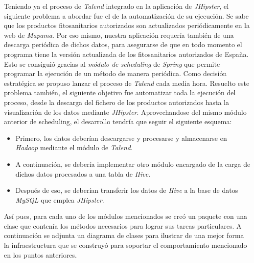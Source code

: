 \par
Teniendo ya el proceso de \textit{Talend} integrado en la aplicación de \textit{JHipster}, el siguiente problema a abordar fue el de la automatización de su ejecución. Se sabe que los productos fitosanitarios autorizados son actualizados periódicamente en la web de \textit{Mapama}. Por eso mismo, nuestra aplicación requería también de una descarga periódica de dichos datos, para asegurarse de que en todo momento el programa tiene la versión actualizada de los fitosanitarios autorizados de España. Esto se consiguió gracias al \textit{módulo de scheduling}\cite{spring_scheduling} de \textit{Spring} que permite programar la ejecución de un método de manera periódica. Como decisión estratégica se propuso lanzar el proceso de \textit{Talend} cada media hora. Resuelto este problema también, el siguiente objetivo fue automatizar toda la ejecución del proceso, desde la descarga del fichero de los productos autorizados hasta la visualización de los datos mediante \textit{JHipster}. Aprovechandose del mismo módulo anterior de scheduling, el desarrollo tendría que seguir el siguiente esquema: 
\begin{itemize}
\item Primero, los datos deberían descargarse y procesarse y almacenarse en \textit{Hadoop} mediante el módulo de \textit{Talend}.
\item A continuación, se debería implementar otro módulo encargado de la carga de dichos datos procesados a una tabla de \textit{Hive}.
\item Después de eso, se deberían transferir los datos de \textit{Hive} a la base de datos \textit{MySQL} que emplea \textit{JHipster}.
\end{itemize}
  \par Así pues, para cada uno de los módulos mencionados se creó un paquete con una clase que contenía los métodos necesarios para lograr sus tareas particulares. A continuación se adjunta un diagrama de clases para ilustrar de una mejor forma la infraestructura que se construyó para soportar el comportamiento mencionado en los puntos anteriores.


